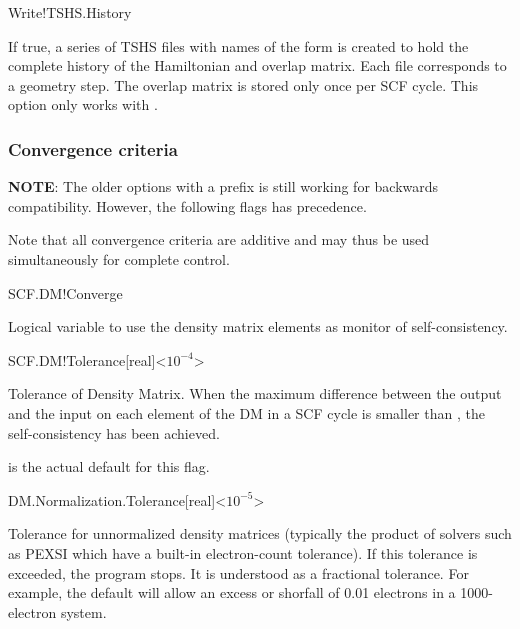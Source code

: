 \begin{fdflogicalF}{Write!TSHS.History}

  If true, a series of TSHS files with names of the form
   is created to hold the complete history of the
  Hamiltonian and overlap matrix. Each file corresponds to a geometry
  step. The overlap matrix is stored only once per SCF cycle. This
  option only works with \tsiesta.

\end{fdflogicalF}


\subsubsection{Convergence criteria}

\textbf{NOTE}: The older options with a  prefix is still
working for backwards compatibility. However, the following flags has
precedence.

Note that all convergence criteria are additive and may thus be used
simultaneously for complete control.

\begin{fdflogicalT}{SCF.DM!Converge}

  Logical variable to use the density matrix elements as monitor
  of self-consistency.
  
\end{fdflogicalT}

\begin{fdfentry}{SCF.DM!Tolerance}[real]<$10^{-4}$>%

  Tolerance of Density Matrix.
  When the maximum difference between the output and the input on each
  element of the DM in a SCF cycle is smaller than
  , the self-consistency has been achieved.


  \note {} is the actual default for this flag.

\end{fdfentry}

\begin{fdfentry}{DM.Normalization.Tolerance}[real]<$10^{-5}$>

  Tolerance for unnormalized density matrices (typically the product
  of solvers such as PEXSI which have a built-in electron-count
  tolerance). If this tolerance is exceeded, the program stops. It is
  understood as a fractional tolerance. For example, the default will
  allow an excess or shorfall of 0.01 electrons in a 1000-electron
  system.

\end{fdfentry}



